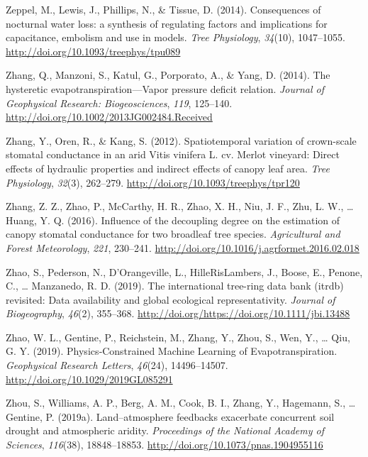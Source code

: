 \documentclass[11pt,twoside]{reedthesis}
\begin{document}
\hypertarget{ref-Zeppel2014}{}
Zeppel, M., Lewis, J., Phillips, N., \& Tissue, D. (2014). Consequences
of nocturnal water loss: a synthesis of regulating factors and
implications for capacitance, embolism and use in models. \emph{Tree
Physiology}, \emph{34}(10), 1047--1055.
\url{http://doi.org/10.1093/treephys/tpu089}

\hypertarget{ref-Zhang2014}{}
Zhang, Q., Manzoni, S., Katul, G., Porporato, A., \& Yang, D. (2014).
The hysteretic evapotranspiration---Vapor pressure deficit relation.
\emph{Journal of Geophysical Research: Biogeosciences}, \emph{119},
125--140. \url{http://doi.org/10.1002/2013JG002484.Received}

\hypertarget{ref-zhang_spatiotemporal_2012}{}
Zhang, Y., Oren, R., \& Kang, S. (2012). Spatiotemporal variation of
crown-scale stomatal conductance in an arid Vitis vinifera L. cv. Merlot
vineyard: Direct effects of hydraulic properties and indirect effects of
canopy leaf area. \emph{Tree Physiology}, \emph{32}(3), 262--279.
\url{http://doi.org/10.1093/treephys/tpr120}

\hypertarget{ref-zhang_influence_2016}{}
Zhang, Z. Z., Zhao, P., McCarthy, H. R., Zhao, X. H., Niu, J. F., Zhu,
L. W., \ldots{} Huang, Y. Q. (2016). Influence of the decoupling degree
on the estimation of canopy stomatal conductance for two broadleaf tree
species. \emph{Agricultural and Forest Meteorology}, \emph{221},
230--241. \url{http://doi.org/10.1016/j.agrformet.2016.02.018}

\hypertarget{ref-Zhao2019}{}
Zhao, S., Pederson, N., D'Orangeville, L., HilleRisLambers, J., Boose,
E., Penone, C., \ldots{} Manzanedo, R. D. (2019). The international
tree-ring data bank (itrdb) revisited: Data availability and global
ecological representativity. \emph{Journal of Biogeography},
\emph{46}(2), 355--368.
\url{http://doi.org/https://doi.org/10.1111/jbi.13488}

\hypertarget{ref-zhao_physicsconstrained_2019}{}
Zhao, W. L., Gentine, P., Reichstein, M., Zhang, Y., Zhou, S., Wen, Y.,
\ldots{} Qiu, G. Y. (2019). Physics‐Constrained Machine Learning of
Evapotranspiration. \emph{Geophysical Research Letters}, \emph{46}(24),
14496--14507. \url{http://doi.org/10.1029/2019GL085291}

\hypertarget{ref-zhou_landatmosphere_2019}{}
Zhou, S., Williams, A. P., Berg, A. M., Cook, B. I., Zhang, Y.,
Hagemann, S., \ldots{} Gentine, P. (2019a). Land--atmosphere feedbacks
exacerbate concurrent soil drought and atmospheric aridity.
\emph{Proceedings of the National Academy of Sciences}, \emph{116}(38),
18848--18853. \url{http://doi.org/10.1073/pnas.1904955116}
\end{document}
